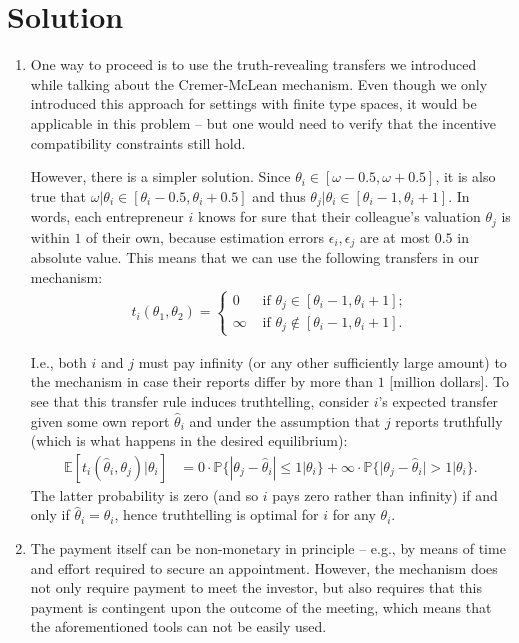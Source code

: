 \documentclass[a4paper]{article}
\newif\ifsolutions
\begin{document}
\ifsolutions
\section*{Solution}
\begin{enumerate}
	\item One way to proceed is to use the truth-revealing transfers we introduced while talking about the Cremer-McLean mechanism. Even though we only introduced this approach for settings with finite type spaces, it would be applicable in this problem -- but one would need to verify that the incentive compatibility constraints still hold.
	
	However, there is a simpler solution. Since $\theta_i \in [ \omega-0.5, \omega+0.5]$, it is also true that $\omega|\theta_i \in [\theta_i-0.5, \theta_i+0.5]$ and thus $\theta_j|\theta_i \in [\theta_i-1, \theta_i+1]$. In words, each entrepreneur $i$ knows for sure that their colleague's valuation $\theta_j$ is within $1$ of their own, because estimation errors $\epsilon_i,\epsilon_j$ are at most $0.5$ in absolute value. This means that we can use the following transfers in our mechanism:
	\begin{align*}
		t_i(\theta_1,\theta_2) = 
		\begin{cases}
			0 & \text{ if } \theta_j \in [\theta_i-1,\theta_i+1];
			\\
			\infty & \text{ if } \theta_j \notin [\theta_i-1,\theta_i+1].
		\end{cases}
	\end{align*}
	
	I.e., both $i$ and $j$ must pay infinity (or any other sufficiently large amount) to the mechanism in case their reports differ by more than $1$ [million dollars]. To see that this transfer rule induces truthtelling, consider $i$'s expected transfer given some own report $\hat{\theta}_i$ and under the assumption that $j$ reports truthfully (which is what happens in the desired equilibrium):
	\begin{align*}
		\mathbb{E} [t_i(\hat{\theta}_i,\theta_j) | \theta_i] &= 0 \cdot \mathbb{P} \{ |\theta_j-\hat{\theta}_i| \leq 1 | \theta_i \} + \infty \cdot \mathbb{P} \{ |\theta_j-\hat{\theta}_i| > 1 | \theta_i \}.
	\end{align*}
	The latter probability is zero (and so $i$ pays zero rather than infinity) if and only if $\hat{\theta}_i = \theta_i$, hence truthtelling is optimal for $i$ for any $\theta_i$.
	
	\item The payment itself can be non-monetary in principle -- e.g., by means of time and effort required to secure an appointment. However, the mechanism does not only require payment to meet the investor, but also requires that this payment is contingent upon the outcome of the meeting, which means that the aforementioned tools can not be easily used. 
	

\end{enumerate}
\end{document}

